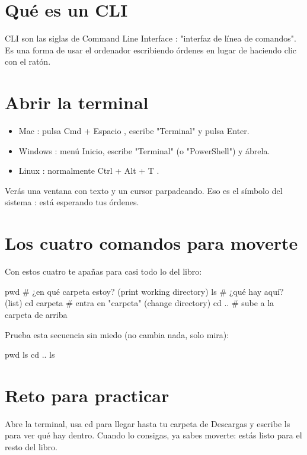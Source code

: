 \documentclass[11pt,a4paper]{book}
\begin{document}
\section{Qué es un CLI}
CLI son las siglas de Command Line Interface : "interfaz de línea de comandos". Es una forma de usar el ordenador escribiendo órdenes en lugar de haciendo clic con el ratón.

\section{Abrir la terminal}
\begin{itemize}\item Mac : pulsa Cmd + Espacio , escribe "Terminal" y pulsa Enter.\end{itemize}
\begin{itemize}\item Windows : menú Inicio, escribe "Terminal" (o "PowerShell") y ábrela.\end{itemize}
\begin{itemize}\item Linux : normalmente Ctrl + Alt + T .\end{itemize}
Verás una ventana con texto y un cursor parpadeando. Eso es el símbolo del sistema : está esperando tus órdenes.

\section{Los cuatro comandos para moverte}
Con estos cuatro te apañas para casi todo lo del libro:

\begin{codebox}
pwd          # ¿en qué carpeta estoy? (print working directory)
ls           # ¿qué hay aquí? (list)
cd carpeta   # entra en "carpeta" (change directory)
cd ..        # sube a la carpeta de arriba
\end{codebox}
Prueba esta secuencia sin miedo (no cambia nada, solo mira):

\begin{codebox}
pwd
ls
cd ..
ls
\end{codebox}
\section{Reto para practicar}
Abre la terminal, usa cd para llegar hasta tu carpeta de Descargas y escribe ls para ver qué hay dentro. Cuando lo consigas, ya sabes moverte: estás listo para el resto del libro.
\end{document}
